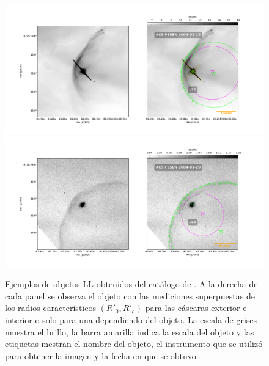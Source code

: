 \begin{figure}
  \centering
    \includegraphics[width=\linewidth]{./Figures/LL1-Bally_01-images}\\  \includegraphics[width=\linewidth]{./Figures/LL4-Bally_24-images}\\ %
  \caption[Ejemplos de objetos LL obtenidos del catálogo de \citet{Gutierrez-Soto:2015a}]{Ejemplos de objetos LL obtenidos del catálogo de \citet{Gutierrez-Soto:2015a}. A la derecha de cada panel se observa el objeto con las mediciones superpuestas de los radios característicos $(R'_0, R'_c)$ para las cáscaras exterior e interior o solo para una dependiendo del objeto. La escala de grises muestra el brillo, la barra amarilla indica la escala del objeto y las etiquetas mestran el nombre del objeto, el instrumento que se utilizó para obtener la imagen y la fecha en que se obtuvo.}
  \label{fig:Luis-mosaic-1}
\end{figure}


